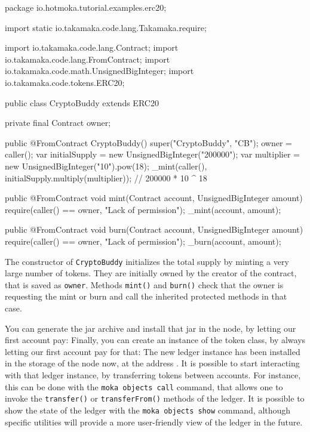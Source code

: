 \begin{codebox}\begin{javalst}
package io.hotmoka.tutorial.examples.erc20;

import static io.takamaka.code.lang.Takamaka.require;

import io.takamaka.code.lang.Contract;
import io.takamaka.code.lang.FromContract;
import io.takamaka.code.math.UnsignedBigInteger;
import io.takamaka.code.tokens.ERC20;

public class CryptoBuddy extends ERC20 {
  private final Contract owner;

  public @FromContract CryptoBuddy() {
    super("CryptoBuddy", "CB");
    owner = caller();
    var initialSupply = new UnsignedBigInteger("200000");
    var multiplier = new UnsignedBigInteger("10").pow(18);
    _mint(caller(), initialSupply.multiply(multiplier)); // 200000 * 10 ^ 18
  }

  public @FromContract void mint(Contract account, UnsignedBigInteger amount) {
    require(caller() == owner, "Lack of permission");
    _mint(account, amount);
  }

  public @FromContract void burn(Contract account, UnsignedBigInteger amount) {
    require(caller() == owner, "Lack of permission");
    _burn(account, amount);
  }
}
\end{javalst}\end{codebox}
%
The constructor of \texttt{CryptoBuddy} initializes the total supply by minting
a very large number of tokens. They are initially owned by the creator of the contract,
that is saved as \texttt{owner}. Methods \texttt{mint()} and \texttt{burn()} check
that the owner is requesting
the mint or burn and call the inherited protected methods in that case.

You can generate the jar archive and install that jar in the node, by letting our first account pay:
%
%
Finally, you can create an instance of the token class, by always letting our first account pay for that:
%
%
The new ledger instance has been installed in the storage of the node now, at the address
\texttt{\ercTwentyObjectShort{}}. It is possible to start interacting with that ledger instance, by transferring
tokens between accounts. For instance, this can be done with the \texttt{moka objects call} command,
that allows one to invoke the \texttt{transfer()} or \texttt{transferFrom()} methods of the ledger.
It is possible to show the state of the ledger with the \texttt{moka objects show} command, although specific
utilities will provide a more user-friendly view of the ledger in the future.

